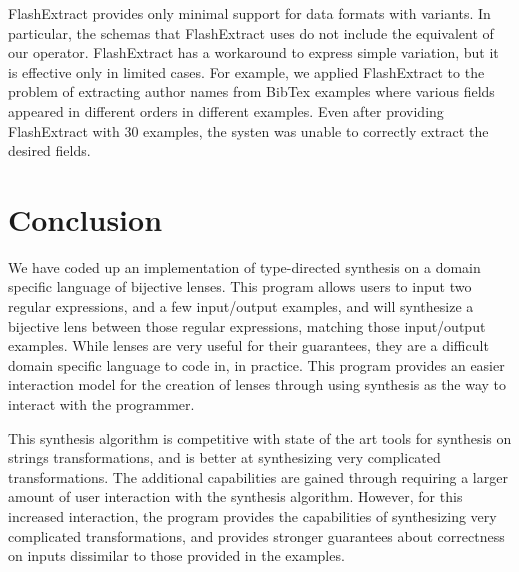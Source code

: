 \documentclass[numbers,10pt,preprint\ifanon ,nocopyrightspace\fi]{sigplanconf}
\begin{document}
FlashExtract provides only minimal support for data formats with
variants.  In particular, the schemas that FlashExtract uses do not
include the equivalent of our \OrRegexType{} operator.  FlashExtract
has a workaround to express simple variation, but it is effective only
in limited cases.  For example, we applied FlashExtract to the problem
of extracting author names from BibTex examples where various fields
appeared in different orders in different examples.  Even after
providing FlashExtract with 30 examples, the systen was unable to correctly
extract the desired fields.





\section{Conclusion}
\label{sec:conc}

We have coded up an implementation of type-directed synthesis on a domain
specific language of bijective lenses.  This program allows users to input two
regular expressions, and a few input/output examples, and will synthesize a
bijective lens between those regular expressions, matching those input/output
examples.  While lenses are very useful for their guarantees, they are a
difficult domain specific language to code in, in practice.  This program
provides an easier interaction model for the creation of lenses through using
synthesis as the way to interact with the programmer.

This synthesis algorithm is competitive with state of the art tools for
synthesis on strings transformations, and is better at synthesizing very
complicated transformations.  The additional capabilities are gained through requiring a
larger amount of user interaction with the synthesis algorithm.  However,
for this increased interaction, the program provides the capabilities of
synthesizing very complicated transformations, and provides stronger guarantees
about correctness on inputs dissimilar to those provided in the
examples.
\end{document}
